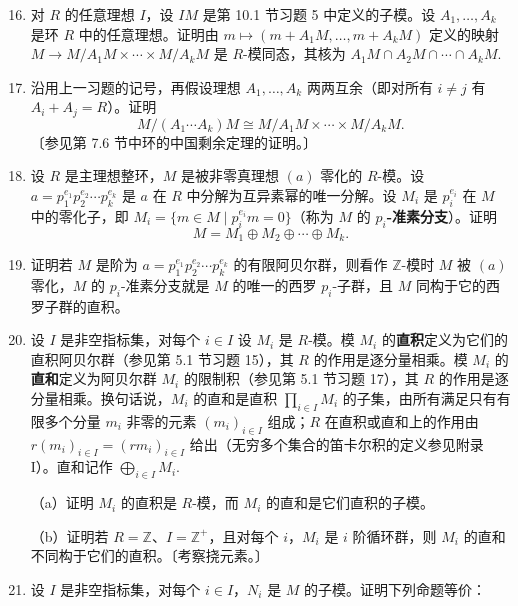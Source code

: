 \begin{enumerate}
\setcounter{enumi}{15}
\item 对 \(R\) 的任意理想 \(I\)，设 \(IM\) 是第 10.1 节习题 5 中定义的子模。设 \(A_1, \ldots, A_k\) 是环 \(R\) 中的任意理想。证明由 \(m \mapsto (m+A_1M, \ldots, m+A_kM)\) 定义的映射 \(M \to M/A_1M \times \cdots \times M/A_kM\) 是 \(R\)-模同态，其核为 \(A_1M \cap A_2M \cap \cdots \cap A_kM\).

\item 沿用上一习题的记号，再假设理想 \(A_1, \ldots, A_k\) 两两互余（即对所有 \(i \neq j\) 有 \(A_i+A_j = R\)）。证明
\[
M/(A_1\cdots A_k)M \cong M/A_1M \times \cdots \times M/A_kM.
\]
〔参见第 7.6 节中环的中国剩余定理的证明。〕

\item 设 \(R\) 是主理想整环，\(M\) 是被非零真理想 \((a)\) 零化的 \(R\)-模。设 \(a = p_1^{e_1}p_2^{e_2}\cdots p_k^{e_k}\) 是 \(a\) 在 \(R\) 中分解为互异素幂的唯一分解。设 \(M_i\) 是 \(p_i^{e_i}\) 在 \(M\) 中的零化子，即 \(M_i = \{m \in M \mid p_i^{e_i}m = 0\}\)（称为 \(M\) 的 \textbf{\(p_i\)-准素分支}）。证明
\[
M = M_1 \oplus M_2 \oplus \cdots \oplus M_k.
\]

\item 证明若 \(M\) 是阶为 \(a = p_1^{e_1}p_2^{e_2}\cdots p_k^{e_k}\) 的有限阿贝尔群，则看作 \(\mathbb{Z}\)-模时 \(M\) 被 \((a)\) 零化，\(M\) 的 \(p_i\)-准素分支就是 \(M\) 的唯一的西罗 \(p_i\)-子群，且 \(M\) 同构于它的西罗子群的直积。

\item 设 \(I\) 是非空指标集，对每个 \(i \in I\) 设 \(M_i\) 是 \(R\)-模。模 \(M_i\) 的\textbf{直积}定义为它们的直积阿贝尔群（参见第 5.1 节习题 15），其 \(R\) 的作用是逐分量相乘。模 \(M_i\) 的\textbf{直和}定义为阿贝尔群 \(M_i\) 的限制积（参见第 5.1 节习题 17），其 \(R\) 的作用是逐分量相乘。换句话说，\(M_i\) 的直和是直积 \(\prod_{i \in I} M_i\) 的子集，由所有满足只有有限多个分量 \(m_i\) 非零的元素 \((m_i)_{i \in I}\) 组成；\(R\) 在直积或直和上的作用由 \(r(m_i)_{i \in I} = (rm_i)_{i \in I}\) 给出（无穷多个集合的笛卡尔积的定义参见附录 I）。直和记作 \(\bigoplus_{i \in I} M_i\).

（a）证明 \(M_i\) 的直积是 \(R\)-模，而 \(M_i\) 的直和是它们直积的子模。

（b）证明若 \(R = \mathbb{Z}\)、\(I = \mathbb{Z}^+\)，且对每个 \(i\)，\(M_i\) 是 \(i\) 阶循环群，则 \(M_i\) 的直和不同构于它们的直积。〔考察挠元素。〕

\item 设 \(I\) 是非空指标集，对每个 \(i \in I\)，\(N_i\) 是 \(M\) 的子模。证明下列命题等价：


\end{enumerate}
